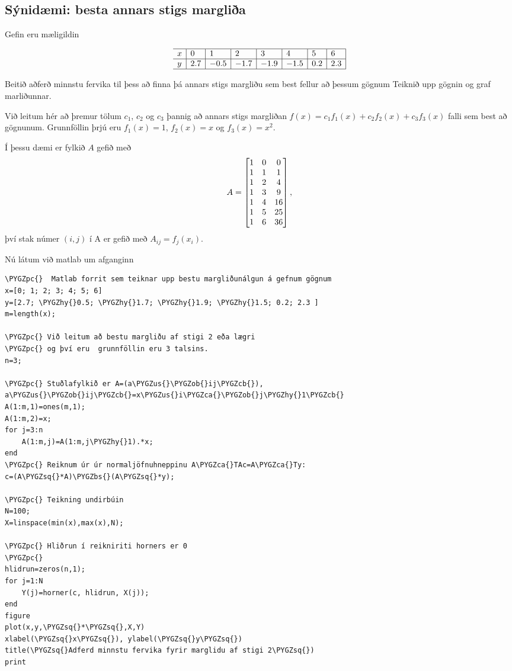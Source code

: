 \documentclass[A4paper,10pt,icelandic]{sphinxmanual}
\def\PYGZbs{\char`\\}
\def\PYGZus{\char`\_}
\def\PYGZob{\char`\{}
\def\PYGZcb{\char`\}}
\def\PYGZca{\char`\^}
\def\PYGZpc{\char`\%}
\def\PYGZhy{\char`\-}
\def\PYGZsq{\char`\'}
\renewcommand\PYGZsq{\textquotesingle}
\begin{document}
\subsection{Sýnidæmi: besta annars stigs margliða}
\label{kafli03:synidaemi-besta-annars-stigs-marglia}
Gefin eru mæligildin

\[
\begin{array}{l|l|l|l|l|l|l|l|}
\hline
x & 0 &1 & 2 & 3 & 4 & 5 & 6\\
\hline
y & 2.7 & -0.5 & -1.7 & -1.9 & -1.5 & 0.2 & 2.3\\
\hline\end{array}
\]

Beitið aðferð minnstu fervika til þess að finna þá annars stigs margliðu
sem best fellur að þessum gögnum Teiknið upp gögnin og graf marliðunnar.

Við leitum hér að þremur tölum \(c_1\), \(c_2\) og
\(c_3\) þannig að annars stigs margliðan
\(f(x)=c_1f_1(x)+c_2f_2(x)+c_3f_3(x)\) falli sem best að gögnunum.
Grunnföllin þrjú eru \(f_1(x)=1\), \(f_2(x)=x\) og
\(f_3(x)=x^2\).

Í þessu dæmi er fylkið \(A\) gefið með
\begin{gather}
\begin{split}A=\left[\begin{matrix}
1 & 0&0\\
1 & 1&1\\
1&2&4\\
1&3&9\\
1&4&16\\
1&5&25\\
1&6&36
\end{matrix}\right],\end{split}\notag
\end{gather}
því stak númer \((i,j)\) í A er gefið með \(A_{ij} = f_j(x_i)\).

Nú látum við matlab um afganginn

\begin{Verbatim}[commandchars=\\\{\}]
\PYGZpc{}  Matlab forrit sem teiknar upp bestu margliðunálgun á gefnum gögnum
x=[0; 1; 2; 3; 4; 5; 6]
y=[2.7; \PYGZhy{}0.5; \PYGZhy{}1.7; \PYGZhy{}1.9; \PYGZhy{}1.5; 0.2; 2.3 ]
m=length(x);

\PYGZpc{} Við leitum að bestu margliðu af stigi 2 eða lægri
\PYGZpc{} og því eru  grunnföllin eru 3 talsins.
n=3;

\PYGZpc{} Stuðlafylkið er A=(a\PYGZus{}\PYGZob{}ij\PYGZcb{}), a\PYGZus{}\PYGZob{}ij\PYGZcb{}=x\PYGZus{}i\PYGZca{}\PYGZob{}j\PYGZhy{}1\PYGZcb{}
A(1:m,1)=ones(m,1);
A(1:m,2)=x;
for j=3:n
    A(1:m,j)=A(1:m,j\PYGZhy{}1).*x;
end
\PYGZpc{} Reiknum úr úr normaljöfnuhneppinu A\PYGZca{}TAc=A\PYGZca{}Ty:
c=(A\PYGZsq{}*A)\PYGZbs{}(A\PYGZsq{}*y);

\PYGZpc{} Teikning undirbúin
N=100;
X=linspace(min(x),max(x),N);

\PYGZpc{} Hliðrun í reikniriti horners er 0
\PYGZpc{}
hlidrun=zeros(n,1);
for j=1:N
    Y(j)=horner(c, hlidrun, X(j));
end
figure
plot(x,y,\PYGZsq{}*\PYGZsq{},X,Y)
xlabel(\PYGZsq{}x\PYGZsq{}), ylabel(\PYGZsq{}y\PYGZsq{})
title(\PYGZsq{}Adferd minnstu fervika fyrir marglidu af stigi 2\PYGZsq{})
print
\end{Verbatim}
\end{document}
